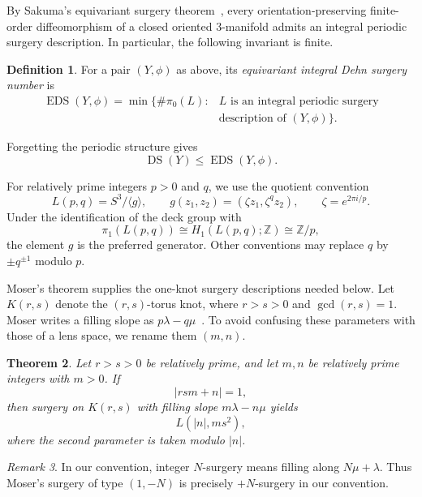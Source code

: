 \documentclass[11pt]{amsart}
\newcommand{\DS}{\operatorname{DS}}
\newcommand{\EDS}{\operatorname{EDS}}
\newcommand{\Z}{\mathbb{Z}}
\newtheorem{theorem}{Theorem}[section]
\theoremstyle{definition}
\newtheorem{definition}[theorem]{Definition}
\theoremstyle{remark}
\newtheorem{remark}[theorem]{Remark}
\begin{document}
By Sakuma's equivariant surgery theorem~\cite{Sakuma}, every orientation-preserving finite-order diffeomorphism of a closed oriented $3$-manifold admits an integral periodic surgery description. In particular, the following invariant is finite.

\begin{definition}
For a pair $(Y,\phi)$ as above, its \emph{equivariant integral Dehn surgery number} is
\[
   \begin{aligned}
   \EDS(Y,\phi)=\min\bigl\{\#\pi_0(L):{}&L\text{ is an integral periodic surgery}\\[-2pt]
      &\text{description of }(Y,\phi)\bigr\}.
   \end{aligned}
\]
\end{definition}

Forgetting the periodic structure gives
\begin{equation}\label{eq:basic-ineq}
   \DS(Y)\leq \EDS(Y,\phi).
\end{equation}

For relatively prime integers $p>0$ and $q$, we use the quotient convention
\[
   L(p,q)=S^3/\langle g\rangle,
   \qquad
   g(z_1,z_2)=(\zeta z_1,\zeta^q z_2),
   \qquad
   \zeta=e^{2\pi i/p}.
\]
Under the identification of the deck group with
\[
   \pi_1(L(p,q))\cong H_1(L(p,q);\Z)\cong \Z/p,
\]
the element $g$ is the preferred generator. Other conventions may replace $q$ by $\pm q^{\pm1}$ modulo $p$.

Moser's theorem supplies the one-knot surgery descriptions needed below. Let $K(r,s)$ denote the $(r,s)$-torus knot, where $r>s>0$ and $\gcd(r,s)=1$. Moser writes a filling slope as $p\lambda-q\mu$~\cite[Section~1, p.~738]{Moser}. To avoid confusing these parameters with those of a lens space, we rename them $(m,n)$.

\begin{theorem}\label{thm:Moser}
Let $r>s>0$ be relatively prime, and let $m,n$ be relatively prime integers with $m>0$. If
\[
   |rsm+n|=1,
\]
then surgery on $K(r,s)$ with filling slope $m\lambda-n\mu$ yields
\[
   L(|n|,ms^2),
\]
where the second parameter is taken modulo $|n|$.
\end{theorem}

\begin{remark}\label{rem:conventions}
In our convention, integer $N$-surgery means filling along $N\mu+\lambda$. Thus Moser's surgery of type $(1,-N)$ is precisely $+N$-surgery in our convention.
\end{remark}
\end{document}
